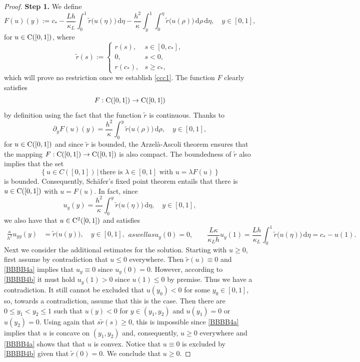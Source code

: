 \documentclass[reqno,11pt]{amsart}
\numberwithin{equation}{section}
\newcommand{\rd}{\mathrm{d}}
\begin{document}
\begin{proof}
{\bf Step 1.} We define
$$
F(u)(y):=c_*-\frac{Lh}{\kappa_L}\int_0^1
  \tilde r \bigl( u(\eta)\bigr)\,\rd \eta-\frac{h^2}{\kappa}
  \int_y^1\int_0^\eta \tilde r \bigl( u(\rho)\bigr)\,\rd\rho \,\rd \eta,\quad y\in [0,1],
$$
for $u\in {\rm C}([0,1])$, where
$$
\tilde r (s):=
\begin{cases}
 r(s),& s\in[0,c_*],\\ 0,&s< 0,\\ r(c_*),& s\geq  c_*,
\end{cases}
$$
which will prove no restriction once we establish \eqref{ccc1}. The
function $F$ clearly satisfies
$$
F: {\rm C}([0,1])\rightarrow {\rm C}([0,1])
$$
by definition using the fact that the function $\tilde r$ is
continuous. Thanks to
$$
\partial_y F(u)(y)=\frac{h^2}{\kappa} \int_0^y \tilde r\bigl(
u(\rho)\bigr)\,\rd \rho,\quad y\in [0,1],
$$
for  $u\in {\rm C}([0,1])$ and since $\tilde r$ is bounded,
the Arzel\`a-Ascoli theorem ensures that the mapping $F:
{\rm C}([0,1])\rightarrow {\rm C}([0,1])$ is also
compact. The boundedness of $\tilde r$ also implies that the set
$$
\left\{u\in C([0,1])\, \big |\,  \text{there is } \lambda\in [0,1] \text { with }
u=\lambda F(u)\right\} 
$$
is bounded. Consequently, Sch\"afer's fixed point \cite[Theorem~11.3]{GT} theorem entails that
there is $u\in {\rm C}([0,1])$ with $u=F(u)$. In fact, since
$$
u_y(y)=\frac{h^2}{\kappa} \int_0^y \tilde r\bigl(u(\eta)\bigr)\,\rd
\eta,\quad y\in [0,1], 
$$
we also have that $u\in {\rm C}^2([0,1])$ and satisfies
\begin{subequations}\label{BBBB4}
\begin{align}\label{BBBB4a}
\frac{\kappa}{h^2} u_{yy}(y)&= \tilde r\bigl(u(y)\bigr),\quad  y\in [0,1],
\end{align}
as well as
\begin{equation}\label{BBBB4b}
u_y(0)=0, \qquad \frac{L\kappa}{\kappa_L h}u_y(1)=\frac{L h}{\kappa_L}
\int_0^1 \tilde r\bigl(u(\eta)\bigr)\,\rd \eta=c_*-u(1).
\end{equation}
\end{subequations}
Next we consider the additional estimates for the solution. Starting
with $u\geq 0$, first assume by contradiction that $u\le 0$
everywhere. Then $\tilde r(u)\equiv 0$ and \eqref{BBBB4a} implies that
$u_y\equiv 0$ since $u_y(0)=0$. However, according to \eqref{BBBB4b} it
must hold $u_y(1)>0$ since $u(1)\le 0$ by premise. Thus we have a
contradiction. It still cannot be excluded that $u(y_0)<0$ for some
$y_0\in [0,1]$, so, towards a contradiction, assume that this is the
case. Then there are $0\le y_1<y_2\le 1$ such that  $u(y)<0$ for
$y\in (y_1,y_2)$ and $u(y_1)=0$ or $u(y_2)=0$. Using again that
$s\tilde r(s)\ge 0$, this is impossible since \eqref{BBBB4a} implies that
$u$ is concave on $(y_1,y_2)$ and, consequently, $u\ge 0$ everywhere
and \eqref{BBBB4a} shows that that $u$ is convex. Notice that
$u\equiv0$ is excluded by \eqref{BBBB4b} given that $\tilde
r(0)=0$. We conclude that $u\geq 0$.


\end{proof}
\end{document}
